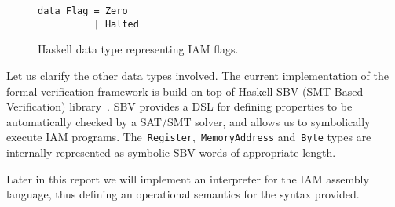 \begin{figure}[H]
\begin{verbatim}
data Flag = Zero
          | Halted
\end{verbatim}
\caption{Haskell data type representing IAM flags.}
\label{Flags}
\end{figure}

Let us clarify the other data types involved. The current implementation of the
formal verification framework is build on top of Haskell SBV (SMT Based Verification)
library~\cite{SBV}. SBV provides a DSL for defining properties to be automatically
checked by a SAT/SMT solver, and allows us to symbolically execute IAM programs.
The~\texttt{Register},~\texttt{MemoryAddress}
and~\texttt{Byte} types are internally represented as symbolic
SBV words of appropriate length.

Later in this report we will implement an interpreter for the IAM assembly language,
thus defining an operational semantics for the syntax provided.
